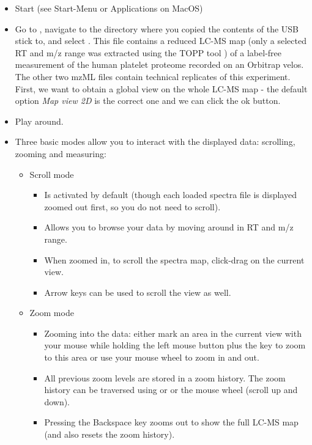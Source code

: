 \begin{itemize}
\item Start  (see Start-Menu or Applications on MacOS)
\item Go to , navigate to the directory where you copied the contents of the USB stick to,
      and select
      . This file contains a reduced LC-MS map (only a selected RT and m/z range
      was extracted using the TOPP tool ) of a label-free measurement of the human platelet proteome recorded on an Orbitrap velos.
      The other two mzML files contain technical replicates of this experiment.
      First, we want to obtain a global view on the whole LC-MS map - the default option \textit{Map view 2D} is the correct one and we can click the ok button. 
\item Play around.
\item Three basic modes allow you to interact with the displayed data: scrolling, zooming and measuring:
    \begin{itemize}
    \item Scroll mode
        \begin{itemize}
        \item Is activated by default (though each loaded spectra file is displayed zoomed out first, so you do not need to scroll).
        \item Allows you to browse your data by moving around in RT and m/z range.
        \item When zoomed in, to scroll the spectra map, click-drag on the current view.
        \item Arrow keys can be used to scroll the view as well.
        \end{itemize}
    \item Zoom mode
        \begin{itemize}
        \item Zooming into the data: either mark an area in the current view with your mouse while holding the left mouse
              button plus the \keys{\ctrl} key to zoom to this area
              or use your mouse wheel to zoom in and out.
        \item All previous zoom levels are stored in a zoom history. The zoom history can be traversed using
              \keys[,]{\ctrl,+} or \keys[,]{\ctrl,-} or the mouse wheel (scroll up and down).
        \item Pressing the Backspace key zooms out to show the full LC-MS map (and also resets the zoom history).

\end{itemize}
\end{itemize}
\end{itemize}
